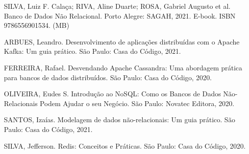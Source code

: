 \begin{pud}
	\item SILVA, Luiz F. Calaça; RIVA, Aline Duarte; ROSA, Gabriel Augusto et al. Banco
	de Dados Não Relacional. Porto Alegre: SAGAH, 2021. E-book. ISBN 9786556901534. (MB)
	
	\bibcomplementar
		\item ARBUES, Leandro. Desenvolvimento de aplicações distribuídas com o
	Apache Kafka: Um guia prático. São Paulo: Casa do Código, 2021.
		\item FERREIRA, Rafael. Desvendando Apache Cassandra: Uma abordagem prática
	para bancos de dados distribuídos. São Paulo: Casa do Código, 2020.
		\item OLIVEIRA, Eudes S. Introdução ao NoSQL: Como os Bancos de Dados Não-
	Relacionais Podem Ajudar o seu Negócio. São Paulo: Novatec Editora, 2020.
		\item 	SANTOS, Izaías. Modelagem de dados não-relacionais: Um guia prático. São
	Paulo: Casa do Código, 2021.
	\item SILVA, Jefferson. Redis: Conceitos e Práticas. São Paulo: Casa do Código, 2020.
	
\end{pud}





